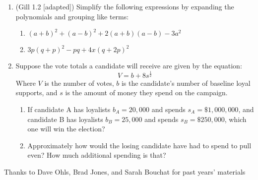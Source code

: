 \documentclass[11pt]{article}
\begin{document}
\begin{enumerate}
\item (Gill 1.2 [adapted]) Simplify the following expressions by expanding the polynomials and grouping like terms:
\begin{enumerate}
  \item $(a+b)^2 + (a-b)^2 + 2(a+b)(a-b) - 3a^2$ %
  \item $3p(q+p)^2 - pq + 4x(q + 2p)^2$ %
\end{enumerate}


\item Suppose the vote totals a candidate will receive are given by the equation:
\begin{equation*}
V = b + 8s^{\frac{1}{2}}
\end{equation*}
Where $V$ is the number of votes, $b$ is the candidate's number of baseline loyal supports, and $s$ is the amount of money they spend on the campaign.
\begin{enumerate}
\item If candidate A has loyalists $b_A = 20,000$ and spends $s_A = \$1,000,000$, and candidate B has loyalists $b_B = 25,000$ and spends $s_B = \$250,000$, which one will win the election? %
\item Approximately how would the losing candidate have had to spend to pull even?  How much additional spending is that? %
\end{enumerate}







\end{enumerate}

\vfill
\begin{center}
\small{Thanks to Dave Ohls, Brad Jones, and Sarah Bouchat for past years' materials}
\end{center}
\end{document}
